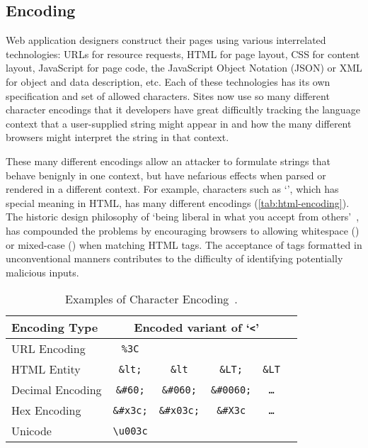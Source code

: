 \subsection{Encoding}\label{sec:encoding}
Web application designers construct their pages using various interrelated technologies: URLs for resource requests, HTML for page layout, CSS for content layout, JavaScript for page code, the JavaScript Object Notation (JSON) or XML for object and data description, etc.
Each of these technologies has its own specification and set of allowed characters.
Sites now use so many different character encodings that it developers have great difficultly tracking the language context that a user-supplied string might appear in and how the many different browsers might interpret the string in that context.

These many different encodings allow an attacker to formulate strings that behave benignly in one context, but have nefarious effects when parsed or rendered in a different context.
For example, characters such as `\code{<}', which has special meaning in HTML, has many different encodings (\autoref{tab:html-encoding}).
The historic design philosophy of `being liberal in what you accept from others'~\cite{rfc761}, has compounded the problems by encouraging browsers to allowing whitespace () or mixed-case () when matching HTML tags.
The acceptance of tags formatted in unconventional manners contributes to the difficulty of identifying potentially malicious inputs.

\begin{table}[ht]
\centering
\begin{tabular}{l|ccccc}
 \textbf{Encoding Type} & \multicolumn{4}{c}{\textbf{Encoded variant of `\texttt{<}'}} \\
 \hline
 URL Encoding           & \texttt{\%3C} &&&\\
 HTML Entity            & \texttt{\&lt;} & \texttt{\&lt} & \texttt{\&LT;} & \texttt{\&LT} \\
 Decimal Encoding       & \texttt{\&\#60;} & \texttt{\&\#060;} & \texttt{\&\#0060;} & \texttt{\ldots} \\
 Hex Encoding           & \texttt{\&\#x3c;} & \texttt{\&\#x03c;} & \texttt{\&\#X3c} & \texttt{\ldots} \\
 Unicode                & \texttt{\textbackslash u003c} &&&\\
\end{tabular}
\caption[Submanifold]{Examples of Character Encoding~\cite{kals.etal+06}.}
\label{tab:html-encoding}
\end{table}

